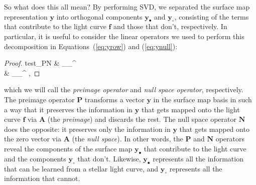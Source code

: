 \documentclass[modern]{aastex62}
\begin{document}
So what does this all mean? By performing SVD, we separated
the surface map representation $\mathbf{y}$ into orthogonal components
$\mathbf{y}_\bullet$ and $\mathbf{y}_\circ$, consisting of the
terms that contribute to the light curve $\mathbf{f}$ and those
that don't, respectively.
In particular, it is useful to consider
the linear operators we used to perform this decomposition
in Equations~(\ref{eq:yrow}) and (\ref{eq:ynull}):
%
\begin{proof}{test_PN}
     & \equiv {}_\bullet {}_\bullet^\top
    \\
     & \equiv {}_\circ {}_\circ^\top
    \quad,
\end{proof}
%
which we will call the \emph{preimage operator} and \emph{null space
    operator}, respectively. The preimage operator $\mathbf{P}$
transforms a vector $\mathbf{y}$ in the surface map basis in such a way
that it preserves the information in $\mathbf{y}$ that gets mapped
onto the light curve $\mathbf{f}$ via $\mathbf{A}$ (the \emph{preimage}) and discards the rest. The
null space operator $\mathbf{N}$ does the opposite: it preserves only
the information in $\mathbf{y}$ that gets mapped onto the zero
vector via $\mathbf{A}$ (the \emph{null space}).
%
In other words,
the $\mathbf{P}$ and $\mathbf{N}$ operators reveal the
components of the surface map $\mathbf{y}_\bullet$ that contribute to the
light curve and the components $\mathbf{y}_\circ$ that don't.
Likewise, $\mathbf{y}_\bullet$ represents all the information that can be
learned from a stellar light curve, and $\mathbf{y}_\circ$ represents all the
information that cannot.
\end{document}
